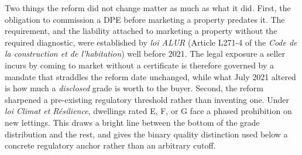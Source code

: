 Two things the reform did not change matter as much as what it did. First, the obligation to
commission a DPE before marketing a property predates it. The requirement, and the liability
attached to marketing a property without the required diagnostic, were established by \emph{loi
ALUR} (Article L271-4 of the \emph{Code de la construction et de l'habitation}) well before 2021.
The legal exposure a seller incurs by coming to market without a certificate is therefore governed
by a mandate that straddles the reform date unchanged, while what July 2021 altered is how much a
\emph{disclosed} grade is worth to the buyer. Second, the reform sharpened a pre-existing
regulatory threshold rather than inventing one. Under \emph{loi Climat et R\'esilience}, dwellings
rated E, F, or G face a phased prohibition on new lettings. This draws a bright line between the
bottom of the grade distribution and the rest, and gives the binary quality distinction used below
a concrete regulatory anchor rather than an arbitrary cutoff.
